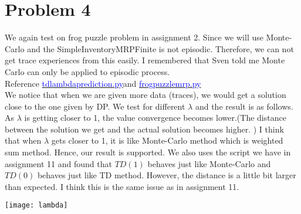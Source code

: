 \documentclass{article}
\begin{document}
\section*{Problem 4}
We again test on frog puzzle problem in assignment 2. Since we will use Monte-Carlo and the SimpleInventoryMRPFinite is not episodic. Therefore, we can not get trace experiences from this easily. I remembered that Sven told me Monte Carlo can only be applied to episodic process.\\
Reference   \href{https://github.com/miaochin/RL-book/tree/master/CME241_assignments/assignment12}{\textcolor{blue}{td\textunderscore lambda\textunderscore prediction.py}}and \href{https://github.com/miaochin/RL-book/tree/master/CME241_assignments/assignment12}{\textcolor{blue}{frog\textunderscore puzzle\textunderscore mrp.py}}\\
We notice that when we are given more data (traces), we would get a solution  close to the one given by DP.
We test for different $\lambda$ and the result is as follows. As $\lambda$ is getting closer to 1, the value convergence becomes lower.(The distance between the solution we get and the actual solution becomes higher. ) I think that when $\lambda$ gets closer to 1, it is like Monte-Carlo method which is weighted sum method. Hence, our result is supported. We also uses the script we have in assignment 11 and found that $TD(1)$ behaves just like Monte-Carlo and $TD(0)$ behaves just like TD method. However, the distance is a little bit larger than expected. I think this is the same issue as in assignment 11.
\begin{center}
\texttt{[image: lambda]}
\end{center} 
\end{document}
